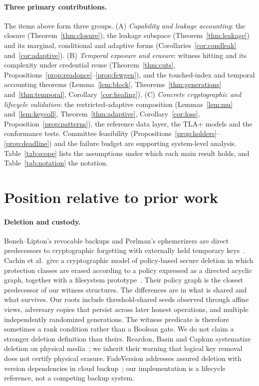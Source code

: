 \documentclass[pdflatex,sn-mathphys-num,twocolumn]{sn-jnl}
\theoremstyle{plain}
\theoremstyle{definition}
\begin{document}
\paragraph{Three primary contributions.}
The items above form three groups. (A) \emph{Capability and leakage accounting}: the closure (Theorem~\ref{thm:closure}), the leakage subspace (Theorem~\ref{thm:leakage}) and its marginal, conditional and adaptive forms (Corollaries~\ref{cor:condleak} and~\ref{cor:adaptive}). (B) \emph{Temporal exposure and erasure}: witness hitting and its complexity under credential reuse (Theorem~\ref{thm:cuts}, Propositions~\ref{prop:readonce}--\ref{prop:fewgen}), and the touched-index and temporal accounting theorems (Lemma~\ref{lem:block}, Theorems~\ref{thm:generations} and~\ref{thm:temporal}, Corollary~\ref{cor:healing}). (C) \emph{Concrete cryptographic and lifecycle validation}: the restricted-adaptive composition (Lemmas~\ref{lem:mu} and~\ref{lem:keycoll}, Theorem~\ref{thm:adaptive}, Corollary~\ref{cor:loss}, Proposition~\ref{prop:patterns}), the reference data layer, the TLA+ models and the conformance tests. Committee feasibility (Propositions~\ref{prop:holders}--\ref{prop:deadline}) and the failure budget are supporting system-level analysis. Table~\ref{tab:scope} lists the assumptions under which each main result holds, and Table~\ref{tab:notation} the notation.

\section{Position relative to prior work}\label{sec:related}

\paragraph{Deletion and custody.}
Boneh--Lipton's revocable backups and Perlman's ephemerizers are direct predecessors to cryptographic forgetting with externally held temporary keys~\cite{boneh1996,perlman2007}. Cachin et al.\ give a cryptographic model of policy-based secure deletion in which protection classes are erased according to a policy expressed as a directed acyclic graph, together with a filesystem prototype~\cite{cachin2013}. Their policy graph is the closest predecessor of our witness structures. The differences are in what is shared and what survives. Our roots include threshold-shared seeds observed through affine views, adversary copies that persist across later honest operations, and multiple independently randomized generations. The witness predicate is therefore sometimes a rank condition rather than a Boolean gate. We do not claim a stronger deletion definition than theirs. Reardon, Basin and Capkun systematize deletion on physical media~\cite{reardon2013}; we inherit their warning that logical key removal does not certify physical erasure. FadeVersion addresses assured deletion with version dependencies in cloud backup~\cite{rahumed2011}; our implementation is a lifecycle reference, not a competing backup system.
\end{document}
